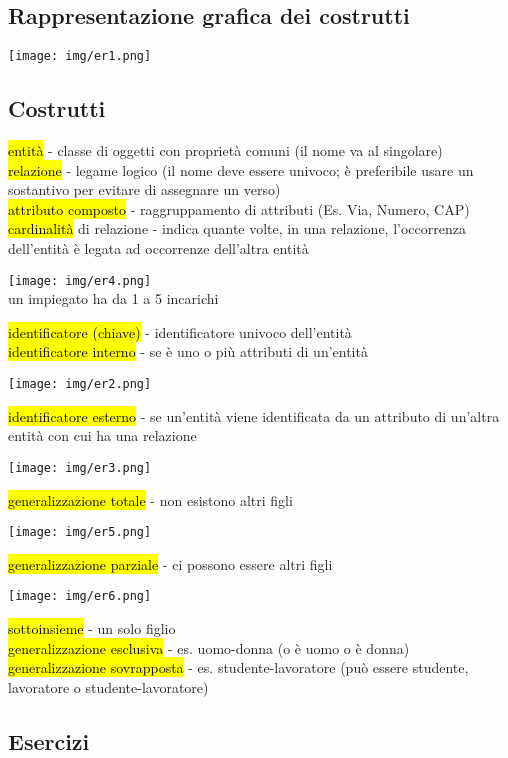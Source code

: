 \documentclass[a4paper]{article}
\begin{document}
\subsection{Rappresentazione grafica dei costrutti}
\begin{center}
      \texttt{[image: img/er1.png]}
\end{center}\par \subsection{Costrutti}
\hl{entità} - classe di oggetti con proprietà comuni (il nome va al singolare)\medskip\\
\hl{relazione} - legame logico (il nome deve essere univoco; è preferibile usare un sostantivo per evitare di assegnare un verso)\medskip\\
\hl{attributo composto} - raggruppamento di attributi (Es. Via, Numero, CAP)\medskip\\
\hl{cardinalità} di relazione - indica quante volte, in una relazione, l'occorrenza dell'entità è legata ad occorrenze dell'altra entità
\begin{center}
      \texttt{[image: img/er4.png]}\\
      un impiegato ha da 1 a 5 incarichi
    \end{center}
\hl{identificatore (chiave)} - identificatore univoco dell’entità\medskip\\
\hl{identificatore interno} - se è uno o più attributi di un’entità
\begin{center}
      \texttt{[image: img/er2.png]}
\end{center}
\hl{identificatore esterno} - se un’entità viene identificata da un attributo di un’altra entità con cui ha una relazione
\begin{center}
      \texttt{[image: img/er3.png]}
\end{center}
\hl{generalizzazione totale} - non esistono altri figli
\begin{center}
      \texttt{[image: img/er5.png]}
\end{center}
\hl{generalizzazione parziale} - ci possono essere altri figli
\begin{center}
      \texttt{[image: img/er6.png]}
\end{center}
\hl{sottoinsieme} - un solo figlio\medskip\\
\hl{generalizzazione esclusiva} - es. uomo-donna (o è uomo o è donna)\medskip\\
\hl{generalizzazione sovrapposta} - es. studente-lavoratore (può essere studente, lavoratore o studente-lavoratore)\par \subsection{Esercizi}
\end{document}

